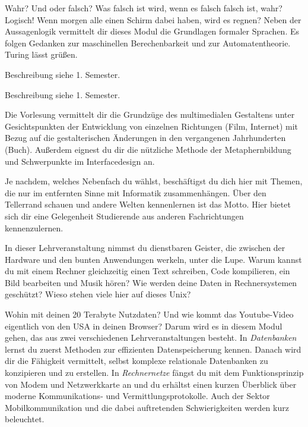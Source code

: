 Wahr?
Und oder falsch?
Was falsch ist wird, wenn es falsch falsch ist, wahr?
Logisch!
Wenn morgen alle einen Schirm dabei haben, wird es regnen?
Neben der Aussagenlogik vermittelt dir dieses Modul die Grundlagen formaler Sprachen.
Es folgen Gedanken zur maschinellen Berechenbarkeit und zur Automatentheorie.
Turing lässt grüßen.

Beschreibung siehe 1. Semester.

Beschreibung siehe 1. Semester.

Die Vorlesung vermittelt dir die Grundzüge des multimedialen Gestaltens unter Gesichtspunkten der Entwicklung von einzelnen Richtungen (Film, Internet) mit Bezug auf die gestalterischen Änderungen in den vergangenen Jahrhunderten (Buch).
Außerdem eignest du dir die nützliche Methode der Metaphernbildung und Schwerpunkte im Interfacedesign an.

\newpage

Je nachdem, welches Nebenfach du wählst, beschäftigst du dich hier mit Themen, die nur im entfernten Sinne mit Informatik zusammenhängen.
Über den Tellerrand schauen und andere Welten kennenlernen ist das Motto.
Hier bietet sich dir eine Gelegenheit Studierende aus anderen Fachrichtungen kennenzulernen.

In dieser Lehrveranstaltung nimmst du dienstbaren Geister, die zwischen der Hardware und den bunten Anwendungen werkeln, unter die Lupe.
Warum kannst du mit einem Rechner gleichzeitig einen Text schreiben, Code kompilieren, ein Bild bearbeiten und Musik hören?
Wie werden deine Daten in Rechnersystemen geschützt?
Wieso stehen viele hier auf dieses Unix?


Wohin mit deinen 20 Terabyte Nutzdaten? Und wie kommt das Youtube-Video eigentlich von den USA in deinen Browser?
Darum wird es in diesem Modul gehen, das aus zwei verschiedenen Lehrveranstaltungen besteht.
In \textit{Datenbanken} lernst du zuerst Methoden zur effizienten Datenspeicherung kennen.
Danach wird dir die Fähigkeit vermittelt, selbst komplexe relationale Datenbanken zu konzipieren und zu erstellen.
In \textit{Rechnernetze} fängst du mit dem Funktionsprinzip von Modem und Netzwerkkarte an und du erhältst einen kurzen Überblick über moderne Kommunikations- und Vermittlungsprotokolle.
Auch der Sektor Mobilkommunikation und die dabei auftretenden Schwierigkeiten werden kurz beleuchtet.

